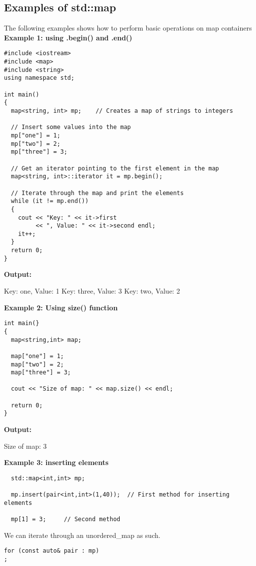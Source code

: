 \documentclass{report}
\begin{document}
\subsection*{Examples of std::map}
The following examples shows how to perform basic operations on map containers
\bigbreak \noindent
\textbf{Example 1: using .begin() and .end()}
\begin{verbatim}
#include <iostream>
#include <map>
#include <string>
using namespace std;

int main()
{
  map<string, int> mp;    // Creates a map of strings to integers

  // Insert some values into the map
  mp["one"] = 1;
  mp["two"] = 2;
  mp["three"] = 3;
  
  // Get an iterator pointing to the first element in the map
  map<string, int>::iterator it = mp.begin();

  // Iterate through the map and print the elements
  while (it != mp.end())
  {
    cout << "Key: " << it->first
         << ", Value: " << it->second endl;
    it++;
  }
  return 0;
}
\end{verbatim}
 \noindent
\textbf{Output:}
\begin{mdframed}
 Key: one, Value: 1 
 \bigbreak \noindent
 Key: three, Value: 3 
 \bigbreak \noindent
 Key: two, Value: 2 
\end{mdframed}
\textbf{Example 2: Using size() function}
\begin{verbatim}
int main(}
{
  map<string,int> map;

  map["one"] = 1;
  map["two"] = 2;
  map["three"] = 3;

  cout << "Size of map: " << map.size() << endl;

  return 0;
}
\end{verbatim}
\textbf{Output:}
\begin{mdframed}
  \vspace{.5mm}
  Size of map: 3  
\end{mdframed}
  \vspace{.5mm}
  \textbf{Example 3: inserting elements }
  \begin{verbatim}
  std::map<int,int> mp;

  mp.insert(pair<int,int>(1,40));  // First method for inserting elements

  mp[1] = 3;     // Second method
  \end{verbatim}
\newpage
\noindent
We can iterate through an unordered\_map as such.
\begin{verbatim}
for (const auto& pair : mp)
;
\end{verbatim}
\end{document}

